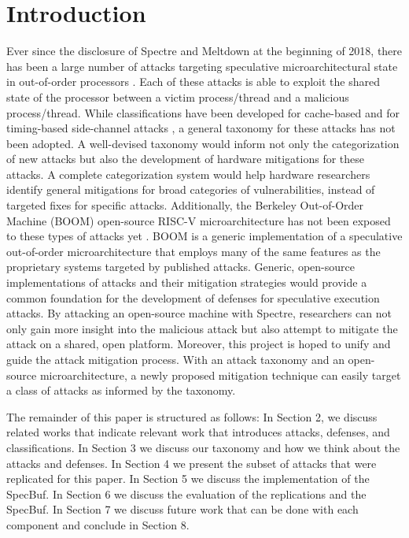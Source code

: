 \section{Introduction}

Ever since the disclosure of Spectre and Meltdown at the beginning of 2018, there has
been a large number of attacks targeting speculative microarchitectural state in
out-of-order processors \cite{b1,b2}. Each of these attacks is able to exploit the shared
state of the processor between a victim process/thread and a malicious process/thread.
While classifications have been developed for cache-based and for timing-based 
side-channel attacks \cite{b5,b6,b7,b9,b10}, a general taxonomy for these attacks has not been adopted.
A well-devised taxonomy would inform not only the 
categorization of new attacks but also the development of hardware mitigations for 
these attacks. A complete categorization system would help hardware researchers 
identify general mitigations for broad categories of vulnerabilities, instead of 
targeted fixes for specific attacks. Additionally, the Berkeley Out-of-Order Machine (BOOM) open-source RISC-V
microarchitecture has not been exposed to these types of attacks yet \cite{b11}. BOOM
is a generic implementation of a speculative 
out-of-order microarchitecture that employs many of the same features as the 
proprietary systems targeted by published attacks. Generic, open-source 
implementations of attacks and their mitigation strategies would provide a common 
foundation for the development of defenses for speculative execution attacks.
By attacking an open-source machine with Spectre, researchers can not only gain more 
insight into the malicious attack but also attempt to mitigate the attack on a shared,
open platform. Moreover, this project is hoped to unify and guide the attack 
mitigation process. With an attack taxonomy and an open-source microarchitecture, a 
newly proposed mitigation technique can easily target a class of attacks as informed 
by the taxonomy.

The remainder of this paper is structured as follows: In Section 2, we discuss
related works that indicate relevant work that introduces attacks, defenses, and classifications.
In Section 3 we discuss our taxonomy and how we think about the attacks and defenses. In
Section 4 we present the subset of attacks that were replicated for this paper. In Section 5
we discuss the implementation of the SpecBuf. In Section 6 we discuss the evaluation of the
replications and the SpecBuf. In Section 7 we discuss future work that can be done with each
component and conclude in Section 8.
